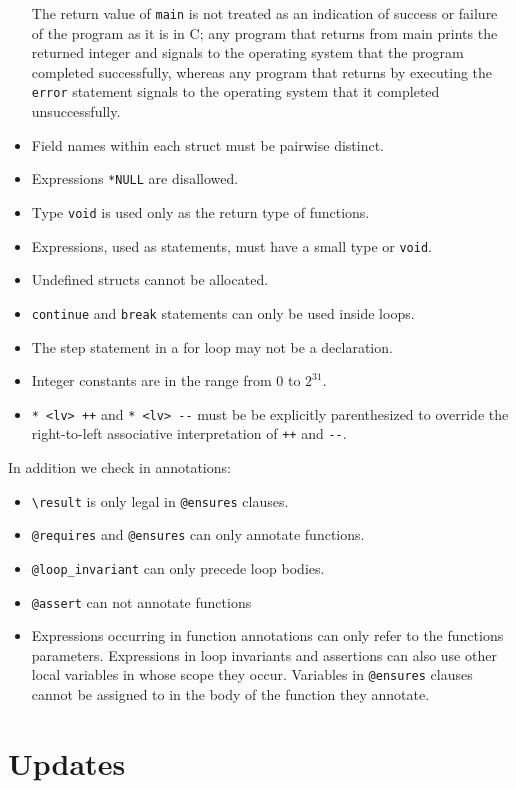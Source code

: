\documentclass[11pt]{article}
\begin{document}
\begin{itemize}
  The return value of \verb'main' is not treated as an indication of
  success or failure of the program as it is in C; any program that
  returns from main prints the returned integer and signals to the
  operating system that the program completed successfully, whereas
  any program that returns by executing the \verb'error' statement
  signals to the operating system that it completed unsuccessfully.
\item Field names within each struct must be pairwise distinct.
\item Expressions \verb'*NULL' are disallowed.
\item Type \verb'void' is used only as the return type of functions.
\item Expressions, used as statements, must have a small type or \verb'void'.
\item Undefined structs cannot be allocated.
\item \verb'continue' and \verb'break' statements can
  only be used inside loops.
\item The step statement in a for loop may not be a declaration.
\item Integer constants are in the range from $0$ to $2^{31}$.
\item \verb'* <lv> ++' and \verb'* <lv> --' must be
  be explicitly parenthesized to override the right-to-left
  associative interpretation of \verb'++' and \verb'--'.
\end{itemize}

In addition we check in annotations:
\begin{itemize}
\item \verb'\result' is only legal in \verb'@ensures' clauses.
\item \verb'@requires' and \verb'@ensures' can only annotate functions.
\item \verb'@loop_invariant' can only precede loop bodies.
\item \verb'@assert' can not annotate functions
\item Expressions occurring in function annotations can only refer to
  the functions parameters.  Expressions in loop invariants and
  assertions can also use other local variables in whose scope they
  occur.  Variables in \verb'@ensures' clauses cannot be assigned to
  in the body of the function they annotate.
\end{itemize}

\section{Updates}
\label{sec:updates}
\hypertarget{sec:updates}{}
\end{document}
